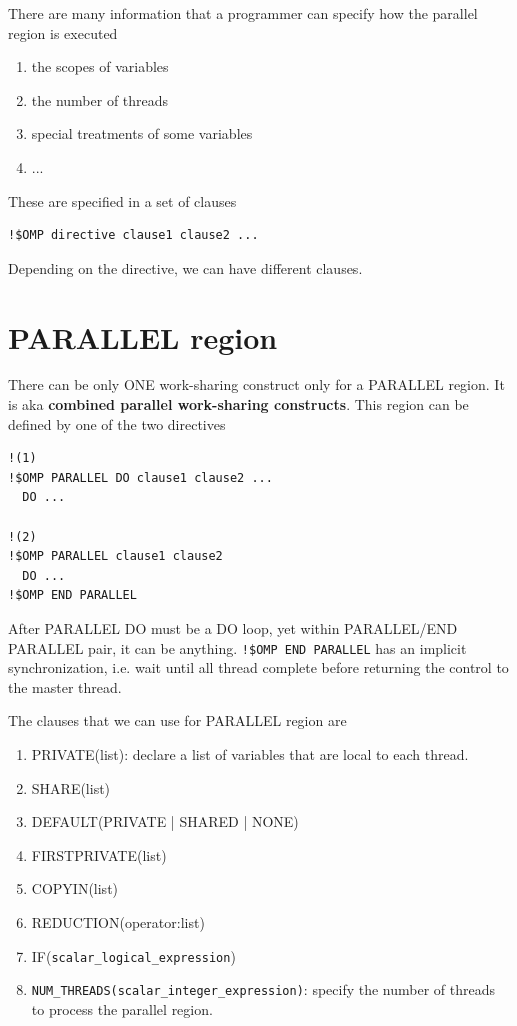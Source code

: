 There are many information that a programmer can specify how the
parallel region is executed
\begin{enumerate}
\item the scopes of variables
\item the number of threads
\item special treatments of some variables
\item ...
\end{enumerate}
These are specified in a set of clauses 
\begin{lstlisting}
!$OMP directive clause1 clause2 ...
\end{lstlisting}
Depending on the directive, we can have different clauses.

\section{PARALLEL region}
\label{sec:parallel-region}

There can be only ONE work-sharing construct only for a PARALLEL
region. It is aka {\bf combined parallel work-sharing
  constructs}. This region can be defined by one of the two directives
\begin{lstlisting}
!(1)
!$OMP PARALLEL DO clause1 clause2 ...
  DO ...

!(2)
!$OMP PARALLEL clause1 clause2
  DO ...
!$OMP END PARALLEL
\end{lstlisting}
After PARALLEL DO must be a DO loop, yet within PARALLEL/END PARALLEL
pair, it can be anything. \verb.!$OMP END PARALLEL. has an implicit
synchronization, i.e. wait until all thread complete before returning
the control to the master thread.

The clauses that we can use for PARALLEL region are
\begin{enumerate}
\item PRIVATE(list): declare a list of variables that are local to
  each thread.
\item SHARE(list)
\item DEFAULT(PRIVATE | SHARED | NONE)
\item FIRSTPRIVATE(list)
\item COPYIN(list)
\item REDUCTION(operator:list)
\item IF(\verb.scalar_logical_expression.)
\item \verb.NUM_THREADS(scalar_integer_expression).: specify the
  number of threads to process the parallel region. 
\end{enumerate}

